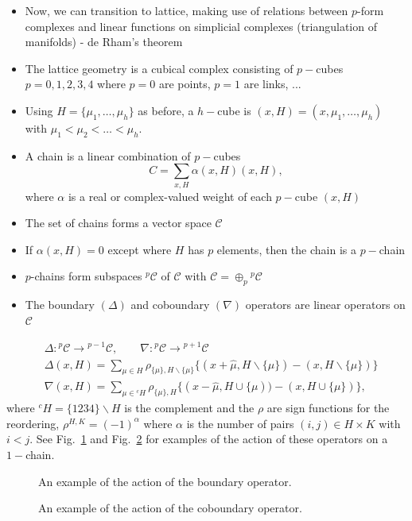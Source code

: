 \begin{itemize}
  \item Now, we can transition to lattice, making use of relations between $p$-form complexes and linear functions on simplicial complexes (triangulation of manifolds) - de Rham's theorem
  \item The lattice geometry is a cubical complex consisting of $p-$cubes $p=0,1,2,3,4$ where $p=0$ are points, $p=1$ are links, ...
  \item Using $H = \{ \mu_1, \ldots, \mu_h\}$ as before, a $h-$cube is $(x,H) = (x, \mu_1, \ldots, \mu_h)$ with $\mu_1 < \mu_2 < \ldots < \mu_h$.
  \item A chain is a linear combination of $p-$cubes
  \begin{equation}
      C = \sum_{x,H}\alpha(x,H)(x,H),
  \end{equation}
  where $\alpha$ is a real or complex-valued weight of each $p-$cube $(x,H)$
  \item The set of chains forms a vector space $\mathcal{C}$
  \item If $\alpha(x,H) = 0$ except where $H$ has $p$ elements, then the chain is a $p-$chain
  \item $p$-chains form subspaces $^p\mathcal{C}$ of $\mathcal{C}$ with $\mathcal{C} = \oplus_p {}^p \mathcal{C}$
  \item The boundary $(\Delta)$ and coboundary $(\nabla)$ operators are linear operators on $\mathcal{C}$ 
\end{itemize}

\begin{equation}
\begin{aligned}
& \Delta:{ }^{p} \mathcal{C} \rightarrow {}^{p-1} \mathcal{C}, \qquad \nabla:{ }^{p} \mathcal{C} \rightarrow {}^{p+1} \mathcal{C} \\
& \Delta(x, H)=\sum_{\mu \in H} \rho_{\{\mu\}, H \backslash \{\mu\}}\{(x+\hat{\mu}, H \backslash\{\mu\})-(x, H \backslash\{\mu\})\} \\
& \nabla(x, H)=\sum_{\mu \in {}^c H} \rho_{\{\mu\},H}\{(x-\hat{\mu}, H \cup\{\mu))-(x, H \cup\{\mu\})\},
\end{aligned}
\end{equation}
where ${}^c H = \{1234\}\backslash H$ is the complement and the $\rho$ are sign functions for the reordering, $\rho^{H,K} = (-1)^\alpha$ where $\alpha$ is the number of pairs $(i,j) \in H \times K$ with $i<j$.
%
See Fig.~\ref{fig:boundary} and Fig.~\ref{fig:coboundary} for examples of the action of these operators on a $1-$chain.
\begin{figure}
    \centering
    \caption{An example of the action of the boundary operator.}
    \label{fig:boundary}
\end{figure}
\begin{figure}
    \centering
    \caption{An example of the action of the coboundary operator.
    \label{fig:coboundary}}
\end{figure}

